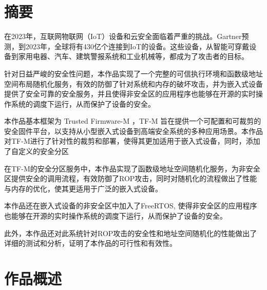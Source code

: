 \documentclass[UTF8,12pt,a4paper]{ctexart}
\numberwithin{figure}{section}
\begin{document}
\section*{摘要}
\par 在2023年，互联网物联网（IoT）设备和云安全面临着严重的挑战。Gartner预测，到2023年，全球将有430亿个连接到IoT的设备。这些设备，从智能可穿戴设备到家用电器、汽车、建筑警报系统和工业机械等，都成为了攻击者的目标。
\par 针对日益严峻的安全性问题，本作品实现了一个完整的可信执行环境和函数级地址空间布局随机化服务，有效的防御了针对系统和内存的破坏攻击，并为嵌入式设备提供了安全可靠的安全服务，并且使得非安全区的应用程序也能够在开源的实时操作系统的调度下运行，从而保护了设备的安全。
\par 本作品基本框架为 Trusted Firmware-M ，TF-M 旨在提供一个可配置和可裁剪的安全固件平台，以支持从小型嵌入式设备到高端安全系统的多种应用场景。本作品对TF-M进行了针对性的裁剪和部署，使得其更加适用于嵌入式设备，同时，添加了自定义的安全分区
\par 在TF-M的安全分区服务中，本作品实现了函数级地址空间随机化服务，为非安全区提供安全的调用流程，有效防御了ROP攻击，同时对随机化的流程做出了性能与内存的优化，使其更适用于广泛的嵌入式设备。
\par 本作品还在嵌入式设备的非安全区中加入了FreeRTOS, 使得非安全区的应用程序也能够在开源的实时操作系统的调度下运行，从而保护了设备的安全。
\par 此外，本作品还对此系统针对ROP攻击的安全性和地址空间随机化的性能做出了详细的测试和分析，证明了本作品的可行性和有效性。
\clearpage
\pagestyle{articleStyle}
\section{作品概述}
\end{document}

